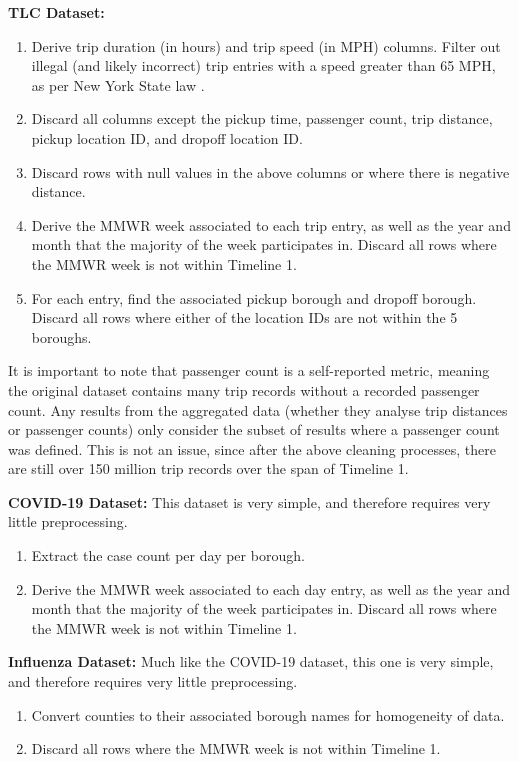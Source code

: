\documentclass[11pt]{article}
\begin{document}
\textbf{TLC Dataset:}
\begin{multicols}{2}
    \begin{enumerate}
        \item Derive trip duration (in hours) and trip speed (in MPH) columns. 
        Filter out illegal (and likely incorrect) trip entries with a speed greater than 65 MPH, 
        as per New York State law \cite{laws}.
        \item Discard all columns except the pickup time, passenger count, trip distance, pickup location ID, and dropoff location ID.
        \item Discard rows with null values in the above columns or where there is negative distance.
        \item Derive the MMWR week associated to each trip entry, as well as the year and month that the majority of the week participates in.
        Discard all rows where the MMWR week is not within Timeline 1.
        \item For each entry, find the associated pickup borough and dropoff borough. 
        Discard all rows where either of the location IDs are not within the 5 boroughs.
    \end{enumerate}
\end{multicols}
It is important to note that passenger count is a self-reported metric, 
meaning the original dataset contains many trip records without a recorded passenger count.
Any results from the aggregated data (whether they analyse trip distances or passenger counts) 
only consider the subset of results where a passenger count was defined.
This is not an issue, since after the above cleaning processes,
there are still over 150 million trip records over the span of Timeline 1.

\textbf{COVID-19 Dataset:}
This dataset is very simple, and therefore requires very little preprocessing.
    \begin{enumerate}
        \item Extract the case count per day per borough.
        \item Derive the MMWR week associated to each day entry, as well as the year and month that the majority of the week participates in.
        Discard all rows where the MMWR week is not within Timeline 1.
    \end{enumerate}

\textbf{Influenza Dataset:}
Much like the COVID-19 dataset, this one is very simple, and therefore requires very little preprocessing.
    \begin{enumerate}
        \item Convert counties to their associated borough names for homogeneity of data.
        \item Discard all rows where the MMWR week is not within Timeline 1.
    \end{enumerate}
\end{document}
